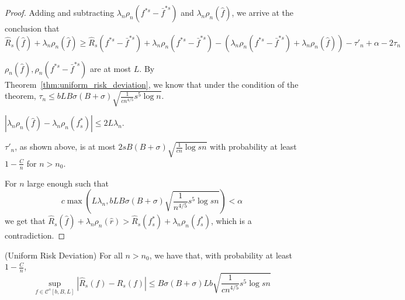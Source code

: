 \begin{proof}
Adding and subtracting $ \lambda_n \rho_n(f^{*s} - \bar{f}^{*s})$ and $ \lambda_n \rho_n(\hat{f})$, we arrive at the conclusion that
\[
\hat{R}_s(\hat{f}) + \lambda_n \rho_n(\hat{f}) \geq \hat{R}_s(f^{*s} - \bar{f}^{*s}) + \lambda_n \rho_n(f^{*s} - \bar{f}^{*s}) - ( \lambda_n \rho_n(f^{*s} - \bar{f}^{*s}) + \lambda_n \rho_n(\hat{f}) ) -\tau'_n + \alpha - 2 \tau_n
\]

$\rho_n(\hat{f}), \rho_n(f^{*s} - \bar{f}^{*s})$ are at most $L$. By Theorem~\ref{thm:uniform_risk_deviation}, we know that under the condition of the theorem, $\tau_n \leq  bLB\sigma(B+\sigma)\sqrt{ \frac{1}{cn^{4/5}} s^5 \log n}$.

$|\lambda_n \rho_n(\hat{f}) - \lambda_n \rho_n(f^*_s)| \leq 2L \lambda_n$.

$\tau'_n$, as shown above, is at most $2sB(B+\sigma) \sqrt{\frac{1}{cn} \log sn}$ with probability at least $1-\frac{C}{n}$ for $n > n_0$.

For $n$ large enough such that
\[
c\max(L\lambda_n,  bLB\sigma(B+\sigma) \sqrt{ \frac{1}{n^{4/5}} s^5 \log sn}) < \alpha
\]
we get that $\hat{R}_s(\hat{f}) + \lambda_n \rho_n(\hat{r}) > \hat{R}_s(f^*_s) + \lambda_n \rho_n(f^*_s)$, which is a contradiction.

\end{proof}

%

\begin{theorem} (Uniform Risk Deviation)
\label{thm:uniform_risk_deviation}
For all $n > n_0$, we have that, with probability at least $1 - \frac{C}{n}$, 
\[
\sup_{f \in \mathcal{C}^s[b,B,L]} |\hat{R}_s(f) - R_s(f)| \leq B\sigma(B+\sigma)Lb\sqrt{ \frac{1}{cn^{4/5}} s^5 \log sn}
\]
\end{theorem}


